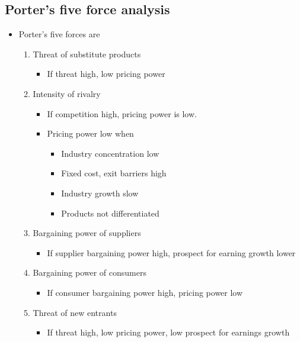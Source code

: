\documentclass[../notes_compiled.tex]{subfiles}
\begin{document}
\subsection{Porter's five force analysis}
\label{sec-porter}
\begin{itemize}
\item Porter's five forces are
\begin{enumerate}
\item Threat of substitute products
\begin{itemize}
\item If threat high, low pricing power
\end{itemize}

\item Intensity of rivalry
\begin{itemize}
\item If competition high, pricing power is low. 
\item Pricing power low when
\begin{itemize}
\item Industry concentration low
\item Fixed cost, exit barriers high
\item Industry growth slow
\item Products not differentiated
\end{itemize}
\end{itemize}

\item Bargaining power of suppliers
\begin{itemize}
\item If supplier bargaining power high, prospect for earning growth lower
\end{itemize}

\item Bargaining power of consumers
\begin{itemize}
\item If consumer bargaining power high, pricing power low
\end{itemize}

\item Threat of new entrants
\begin{itemize}
\item If threat high, low pricing power, low prospect for earnings growth
\end{itemize}
\end{enumerate}
\end{itemize}
\end{document}
